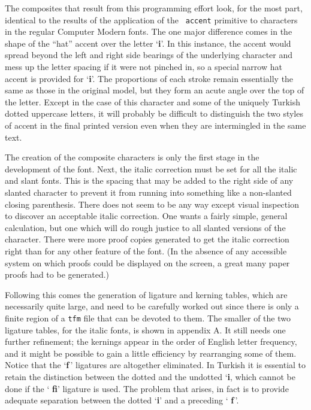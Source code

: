 The composites that result from this programming effort look, for the
most part, identical to the results of the application of the {\tt\bs
accent} primitive to characters in the regular Computer Modern fonts.
The one major difference comes in the shape of the ``hat'' accent over
the letter `{\bf i}'.  In this instance, the accent would spread beyond the
left and right side bearings of the underlying character and mess up the
letter spacing if it were
not pinched in, so a special narrow hat accent is provided for `{\bf i}'.  
The proportions of each stroke remain essentially the same as
those in the original model, but they form an acute angle over the top
of the letter.  Except in the case of this character and some of the 
uniquely Turkish dotted uppercase letters, 
it will probably be difficult to distinguish the two styles of accent 
in the final printed version even when they are
intermingled in the same text.

The creation of the composite characters is only the first stage in
the development of the font.  Next, the italic correction must be set
for all the italic and slant fonts.  This is the spacing that may be
added to the right side of any slanted character to prevent it from
running into something like a non-slanted closing parenthesis.  There
does not seem to be any way except visual inspection to discover an
acceptable italic correction.  One wants a fairly simple, general
calculation, but one which will do rough justice
to all slanted versions of the character.  There were more proof
copies generated to get the italic correction right than for any other
feature of the font.  (In the absence of any accessible system on which
proofs could be displayed on the screen, a great many paper proofs had
to be generated.)

Following this comes the generation of ligature and kerning tables,
which are necessarily quite large, and need to be carefully worked out
since there is only a finite region of a {\tt tfm} file that can be
devoted to them.  The smaller of the two ligature tables, for the
italic fonts, is shown in appendix A.  It still needs one further refinement;
the kernings appear in the order of English letter frequency, and it
might be possible to gain a little efficiency by rearranging some of
them.  Notice that the `{\bf f$\,$}' ligatures are altogether eliminated.
In Turkish it is essential to retain the distinction between the
dotted and the undotted `{\bf i}, which cannot be done if the `{\bf
fi}' ligature is used.  The problem that arises, in fact is to provide
adequate separation between the dotted `{\bf i}' and a preceding `{\bf
f$\,$}'.

